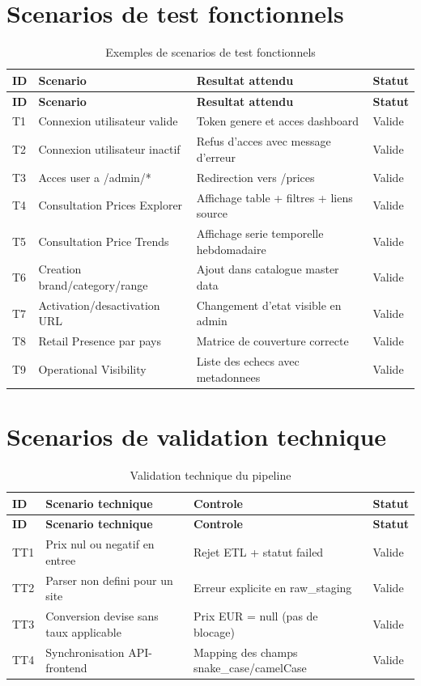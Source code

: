 \section{Scenarios de test fonctionnels}
\begin{longtable}{p{0.8cm}p{5.0cm}p{4.1cm}p{4.1cm}}
\caption{Exemples de scenarios de test fonctionnels}\label{tab:tests-fonctionnels}\\
\toprule
\textbf{ID} & \textbf{Scenario} & \textbf{Resultat attendu} & \textbf{Statut} \\
\midrule
\endfirsthead
\toprule
\textbf{ID} & \textbf{Scenario} & \textbf{Resultat attendu} & \textbf{Statut} \\
\midrule
\endhead
T1 & Connexion utilisateur valide & Token genere et acces dashboard & Valide \\
T2 & Connexion utilisateur inactif & Refus d'acces avec message d'erreur & Valide \\
T3 & Acces user a /admin/* & Redirection vers /prices & Valide \\
T4 & Consultation Prices Explorer & Affichage table + filtres + liens source & Valide \\
T5 & Consultation Price Trends & Affichage serie temporelle hebdomadaire & Valide \\
T6 & Creation brand/category/range & Ajout dans catalogue master data & Valide \\
T7 & Activation/desactivation URL & Changement d'etat visible en admin & Valide \\
T8 & Retail Presence par pays & Matrice de couverture correcte & Valide \\
T9 & Operational Visibility & Liste des echecs avec metadonnees & Valide \\
\bottomrule
\end{longtable}

\section{Scenarios de validation technique}
\begin{longtable}{p{0.8cm}p{5.2cm}p{4.0cm}p{4.0cm}}
\caption{Validation technique du pipeline}\label{tab:tests-techniques}\\
\toprule
\textbf{ID} & \textbf{Scenario technique} & \textbf{Controle} & \textbf{Statut} \\
\midrule
\endfirsthead
\toprule
\textbf{ID} & \textbf{Scenario technique} & \textbf{Controle} & \textbf{Statut} \\
\midrule
\endhead
TT1 & Prix nul ou negatif en entree & Rejet ETL + statut failed & Valide \\
TT2 & Parser non defini pour un site & Erreur explicite en raw\_staging & Valide \\
TT3 & Conversion devise sans taux applicable & Prix EUR = null (pas de blocage) & Valide \\
TT4 & Synchronisation API-frontend & Mapping des champs snake\_case/camelCase & Valide \\
\bottomrule
\end{longtable}

